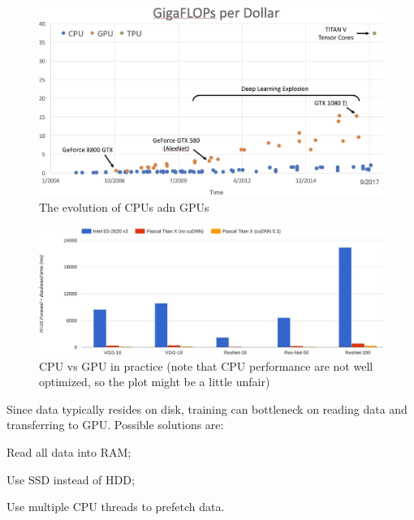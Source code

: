 \begin{minipage}{.5\linewidth}
    \begin{figure}[H]
        \centering
        \includegraphics[width=0.9\linewidth]{images/dl-gpus1}
        \caption[The evolution of CPUs adn GPUs]{The evolution of CPUs adn GPUs}
        \label{fig:dl-gpus1}
    \end{figure}
\end{minipage}
\begin{minipage}{.5\linewidth}
    \begin{figure}[H]
        \centering
        \includegraphics[width=0.9\linewidth]{images/dl-gpus2}
        \caption[CPU vs GPU in practice]{CPU vs GPU in practice (note that CPU performance are not well optimized, so the plot might be a little unfair)}
        \label{fig:dl-gpus2}
    \end{figure}
\end{minipage}

Since data typically resides on disk, training can bottleneck on reading data and transferring to GPU. Possible solutions are:
\begin{myitem}
    \item Read all data into RAM;
    \item Use SSD instead of HDD;
    \item Use multiple CPU threads to prefetch data.
\end{myitem}


